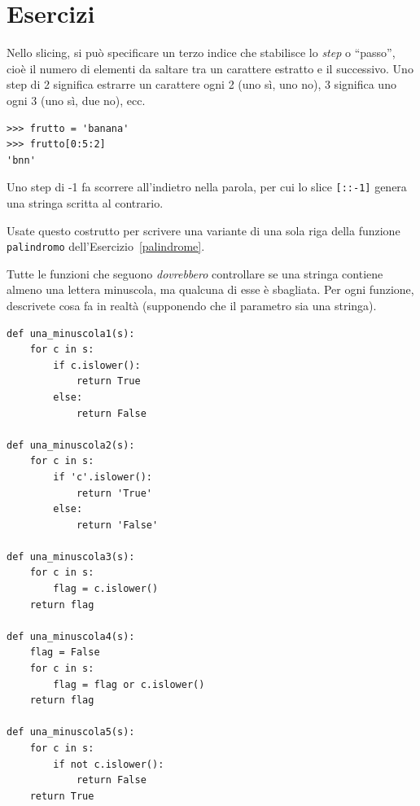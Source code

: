 \documentclass[10pt]{book}
\begin{document}
\section{Esercizi}

\begin{exercise}

Nello slicing, si può specificare un terzo indice che stabilisce lo {\em step} o ``passo'', cioè il numero di elementi da saltare tra un carattere estratto e il successivo. Uno step di 2 significa estrarre un carattere ogni 2 (uno sì, uno no), 3 significa uno ogni 3 (uno sì, due no), ecc.

\begin{verbatim}
>>> frutto = 'banana'
>>> frutto[0:5:2]
'bnn'
\end{verbatim}

Uno step di -1 fa scorrere all'indietro nella parola, per cui lo slice \verb"[::-1]" genera una stringa scritta al contrario.

Usate questo costrutto per scrivere una variante di una sola riga della funzione \verb"palindromo" dell'Esercizio~\ref{palindrome}.
\end{exercise}

\vspace{0.2in}
\begin{exercise}

Tutte le funzioni che seguono {\em dovrebbero} controllare se una stringa contiene almeno una lettera minuscola, ma qualcuna di esse è sbagliata. Per ogni funzione, descrivete cosa fa in realtà (supponendo che il parametro sia una stringa).

\begin{verbatim}
def una_minuscola1(s):
    for c in s:
        if c.islower():
            return True
        else:
            return False

def una_minuscola2(s):
    for c in s:
        if 'c'.islower():
            return 'True'
        else:
            return 'False'

def una_minuscola3(s):
    for c in s:
        flag = c.islower()
    return flag

def una_minuscola4(s):
    flag = False
    for c in s:
        flag = flag or c.islower()
    return flag

def una_minuscola5(s):
    for c in s:
        if not c.islower():
            return False
    return True
\end{verbatim}

\end{exercise}
\end{document}
